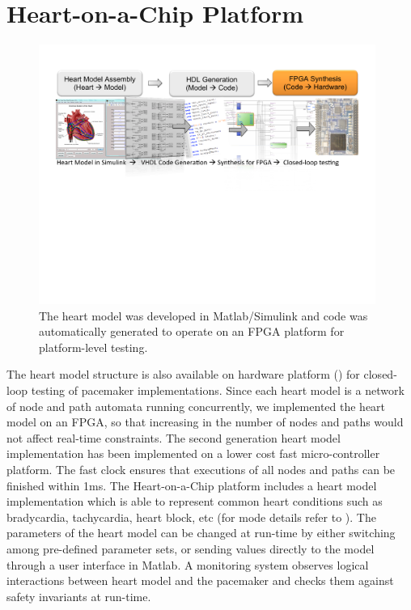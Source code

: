 \section{Heart-on-a-Chip Platform}
\begin{figure}[!t]
\center
		\includegraphics[width=0.98\textwidth]{figs/modeling_heart.pdf}
\caption{The heart model was developed in Matlab/Simulink and code was automatically generated to operate on an FPGA platform for platform-level testing.}
\label{fig:modeling_heart}
\end{figure}
The heart model structure is also available  on hardware platform () for closed-loop testing of pacemaker implementations. 
Since each heart model is a network of node and path automata running concurrently, we implemented the heart model on an FPGA, so that increasing in the number of nodes and paths would not affect real-time constraints. 
The second generation heart model implementation has been implemented on a lower cost fast micro-controller platform. 
The fast clock ensures that executions of all nodes and paths can be finished within 1ms. 
The Heart-on-a-Chip platform includes a heart model implementation which is able to represent common heart conditions such as bradycardia, tachycardia, heart block, etc (for mode details refer to \cite{VHM_proc}). 
The parameters of the heart model can be changed at run-time by either switching among pre-defined parameter sets, or sending values directly to the model through a user interface in Matlab. 
A monitoring system observes logical interactions between heart model and the pacemaker and checks them against safety invariants at run-time. 

